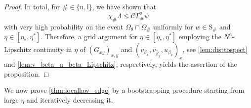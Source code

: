 \documentclass[10pt,a4paper]{amsart}
\numberwithin{equation}{section}
\newcommand*\ubarr[1]{{\widehat{#1}}}
\begin{document}
\begin{proof}
		In total, for $\# \in \{ \mathrm{u}, \mathrm{l}\}$, we have shown that
		\[ \chi_\# \Lambda \leq \mathcal C  \Gamma_\#^2 \psi\] 
		with very high probability on the event $\Omega_\theta\cap \Omega_{\#}$ 
		uniformly for $w \in \mathrm{S}_\#$ and $\eta \in [\eta_*, \eta^*]$. Therefore, a grid argument for $\eta \in [\eta_\ast, \eta^\ast]$ employing the $N^6$-Lipschitz continuity in $\eta$ of  $(G_{xy})_{x,y}$ and $(v_{\beta_x}, v_{\ubarr{\beta}_x},u_{\beta_x})_{x}$, see \cref{lem:disttospect} and \cref{lem:v_beta_u_beta_Lipschitz}, respectively, yields the assertion of the proposition.
		
	\end{proof}
	
	We now prove \cref{thm:locallaw_edge} by a bootstrapping procedure starting from large $\eta$ and iteratively decreasing it. 
	
\end{document}
